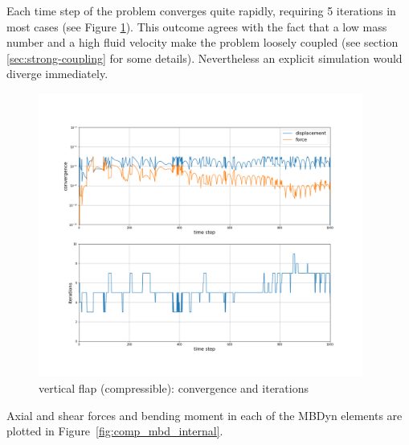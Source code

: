 Each time step of the problem converges quite rapidly, requiring 5 iterations in most cases (see Figure \ref{fig:comp_mbd_iter}). This outcome agrees with the fact that a low mass number and a high fluid velocity make the problem loosely coupled (see section \ref{sec:strong-coupling} for some details). Nevertheless an explicit simulation would diverge immediately.  


\begin{figure}[htbp!]
	\centering
	\includegraphics[width=0.95\textwidth, trim=0 80 0 100, clip]{images/comp_flap/MBD_iterations_comp.png}
	\caption{vertical flap (compressible): convergence and iterations}
	\label{fig:comp_mbd_iter}
\end{figure}

Axial and shear forces and bending moment in each of the MBDyn elements are plotted in Figure~\ref{fig:comp_mbd_internal}.


